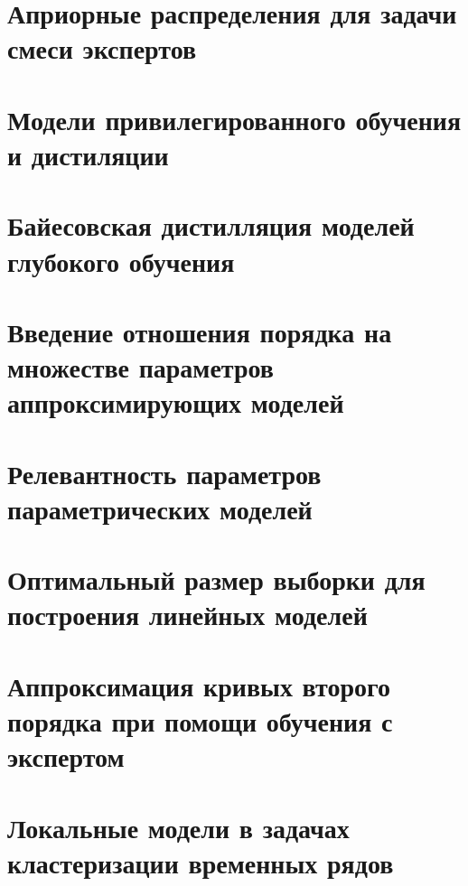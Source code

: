 \documentclass{dissert}
\numberwithin{equation}{section}
\begin{document}

\setcounter{page}{2}

\newpage
\tableofcontents



\clearpage
\chapter{Априорные распределения для задачи смеси экспертов}


\clearpage
\chapter{Модели привилегированного обучения и дистиляции}


\clearpage
\chapter{Байесовская дистилляция моделей глубокого обучения}


\clearpage
\chapter{Введение отношения порядка на множестве параметров аппроксимирующих моделей}


\clearpage
\chapter{Релевантность параметров параметрических моделей}


\clearpage
\chapter{Оптимальный размер выборки для построения линейных моделей}


\clearpage
\chapter{Аппроксимация кривых второго порядка при помощи обучения с экспертом}


\clearpage
\chapter{Локальные модели в задачах кластеризации временных рядов}






%
\end{document}
